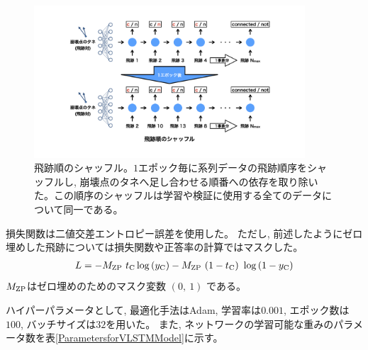 \begin{figure}[htbp]
 \centering
 \includegraphics[trim = 150 100 150 100, width=0.9\textwidth, clip]{Figure/3Networks/3-4-2-1TrackShuffle.png}
 \caption[飛跡順のシャッフル]{飛跡順のシャッフル。$1$エポック毎に系列データの飛跡順序をシャッフルし, 崩壊点のタネへ足し合わせる順番への依存を取り除いた。この順序のシャッフルは学習や検証に使用する全てのデータについて同一である。}
 \label{3-4-2-1TrackShuffle}
\end{figure}

損失関数は二値交差エントロピー誤差を使用した。
ただし, 前述したようにゼロ埋めした飛跡については損失関数や正答率の計算ではマスクした。
\begin{equation}
 \begin{split}
 L = -M_{\rm ZP}\ t_{\rm C} \log{(y_{\rm C})} - M_{\rm ZP}\ (1-t_{\rm C})\ \log{(1-y_{\rm C})}
 \end{split}
\end{equation}
$M_{\rm ZP}$はゼロ埋めのためのマスク変数 $(0,\ 1)$ である。

ハイパーパラメータとして, 最適化手法はAdam, 学習率は$0.001$, エポック数は$100$, バッチサイズは$32$を用いた。
また, ネットワークの学習可能な重みのパラメータ数を表\ref{ParametersforVLSTMModel}に示す。

